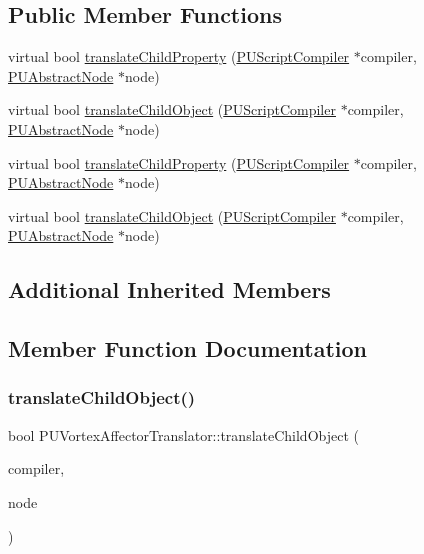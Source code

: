 \subsection*{Public Member Functions}
\begin{DoxyCompactItemize}
\item 
virtual bool \hyperlink{classPUVortexAffectorTranslator_aa452f3dfbbfabb4bddd341fbf39e5381}{translate\+Child\+Property} (\hyperlink{classPUScriptCompiler}{P\+U\+Script\+Compiler} $\ast$compiler, \hyperlink{classPUAbstractNode}{P\+U\+Abstract\+Node} $\ast$node)
\item 
virtual bool \hyperlink{classPUVortexAffectorTranslator_ab24d99c5c3b2213b06a78286bd84000a}{translate\+Child\+Object} (\hyperlink{classPUScriptCompiler}{P\+U\+Script\+Compiler} $\ast$compiler, \hyperlink{classPUAbstractNode}{P\+U\+Abstract\+Node} $\ast$node)
\item 
virtual bool \hyperlink{classPUVortexAffectorTranslator_a64fa28da7b64de6450f190184c442b9c}{translate\+Child\+Property} (\hyperlink{classPUScriptCompiler}{P\+U\+Script\+Compiler} $\ast$compiler, \hyperlink{classPUAbstractNode}{P\+U\+Abstract\+Node} $\ast$node)
\item 
virtual bool \hyperlink{classPUVortexAffectorTranslator_a87591d4812a14a757f68dfe38ee1c109}{translate\+Child\+Object} (\hyperlink{classPUScriptCompiler}{P\+U\+Script\+Compiler} $\ast$compiler, \hyperlink{classPUAbstractNode}{P\+U\+Abstract\+Node} $\ast$node)
\end{DoxyCompactItemize}
\subsection*{Additional Inherited Members}


\subsection{Member Function Documentation}
\mbox{\label{classPUVortexAffectorTranslator_ab24d99c5c3b2213b06a78286bd84000a}} 
\subsubsection{\texorpdfstring{translate\+Child\+Object()}{translateChildObject()}\hspace{0.1cm}{\footnotesize\ttfamily [1/2]}}
{\footnotesize\ttfamily bool P\+U\+Vortex\+Affector\+Translator\+::translate\+Child\+Object (\begin{DoxyParamCaption}\item[{\hyperlink{classPUScriptCompiler}{P\+U\+Script\+Compiler} $\ast$}]{compiler,  }\item[{\hyperlink{classPUAbstractNode}{P\+U\+Abstract\+Node} $\ast$}]{node }\end{DoxyParamCaption})\hspace{0.3cm}{\ttfamily [virtual]}}

